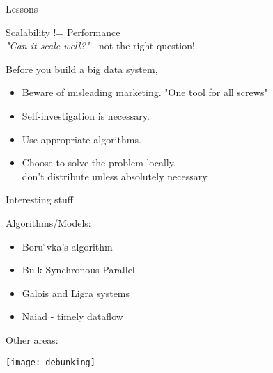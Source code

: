 \begin{frame}[t]{Lessons}

  \begin{center}
    \large{Scalability != Performance}\\
    \vspace{0.1cm}
    \textit{"Can it scale well?"} - not the right question!
  \end{center}
  
  \vspace{0.5cm}
  \pause
  
  Before you build a big data system,
  \vspace{0.1cm}
  \begin{itemize}
    \item Beware of misleading marketing. "One tool for all screws"
    \item Self-investigation is necessary.
    \item Use appropriate algorithms.
    \item Choose to solve the problem locally,\\ don't distribute unless absolutely necessary.
  \end{itemize}

\end{frame}

\begin{frame}[t]{Interesting stuff}

  \vspace{0.25cm}

  Algorithms/Models:
  \vspace{0.25cm}
  \begin{itemize}
    \item Boru ̊vka’s algorithm
    \item Bulk Synchronous Parallel
    \item Galois and Ligra systems
    \item Naiad - timely dataflow
  \end{itemize}

  \vspace{0.5cm}

  Other areas:
  \vspace{0.25cm}

  \begin{center}
    \texttt{[image: debunking]}
  \end{center}

  \vspace{0.25cm}

\end{frame}

